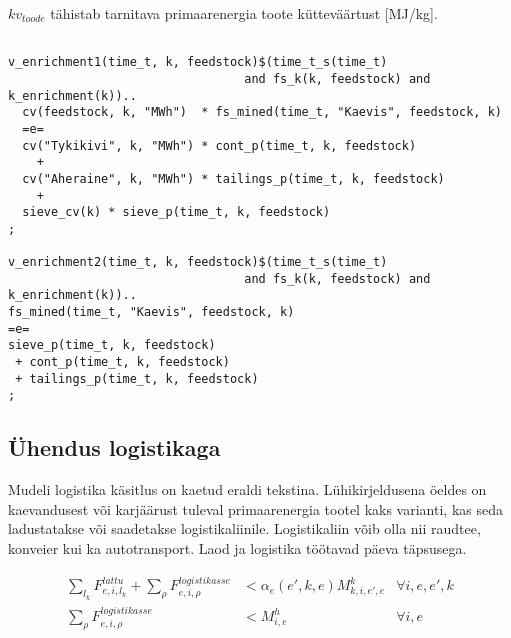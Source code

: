 \documentclass[10pt,a4paper]{article}
\begin{document}
$kv_{toode}$ tähistab tarnitava primaarenergia toote kütteväärtust [MJ/kg].

\begin{verbatim}

v_enrichment1(time_t, k, feedstock)$(time_t_s(time_t)
                                 and fs_k(k, feedstock) and k_enrichment(k))..
  cv(feedstock, k, "MWh")  * fs_mined(time_t, "Kaevis", feedstock, k)
  =e=
  cv("Tykikivi", k, "MWh") * cont_p(time_t, k, feedstock)
    +
  cv("Aheraine", k, "MWh") * tailings_p(time_t, k, feedstock)
    +
  sieve_cv(k) * sieve_p(time_t, k, feedstock)
;

v_enrichment2(time_t, k, feedstock)$(time_t_s(time_t)
                                 and fs_k(k, feedstock) and k_enrichment(k))..
fs_mined(time_t, "Kaevis", feedstock, k)
=e=
sieve_p(time_t, k, feedstock)
 + cont_p(time_t, k, feedstock)
 + tailings_p(time_t, k, feedstock)
;
\end{verbatim}

\subsection{Ühendus logistikaga}
Mudeli logistika käsitlus on kaetud eraldi tekstina. Lühikirjeldusena öeldes on kaevandusest või karjäärust tuleval primaarenergia tootel kaks varianti, kas seda ladustatakse või saadetakse logistikaliinile. Logistikaliin võib olla nii raudtee, konveier kui ka autotransport. Laod ja logistika töötavad päeva täpsusega.

\begin{align}
\sum_{l_k} F^{lattu}_{e,i,l_k} + \sum_{\rho} F^{logistikasse}_{e,i,\rho} &< \mathit{\alpha}_e(e', k, e) M^k_{k,i,e', e} & \forall i,e,e',k \\
\sum_{\rho} F^{logistikasse}_{e,i,\rho} &< M^h_{i,e} & \forall i,e 
\end{align}
\end{document}
